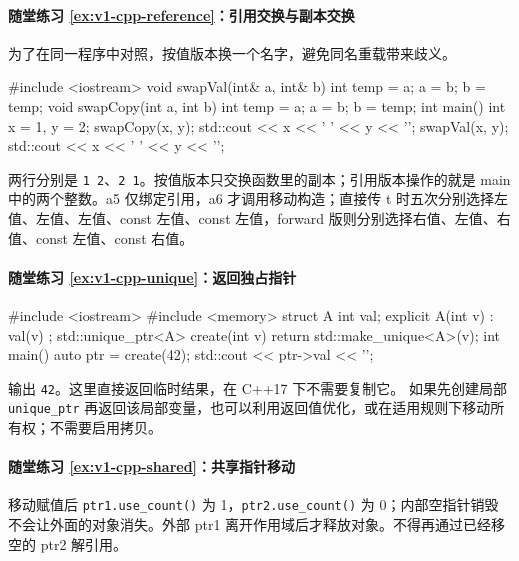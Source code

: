 \paragraph*{随堂练习 \ref{ex:v1-cpp-reference}：引用交换与副本交换}
\begin{solution}
为了在同一程序中对照，按值版本换一个名字，避免同名重载带来歧义。
\begin{tcpp}
#include <iostream>
void swapVal(int& a, int& b) {
    int temp = a; a = b; b = temp;
}
void swapCopy(int a, int b) {
    int temp = a; a = b; b = temp;
}
int main() {
    int x = 1, y = 2;
    swapCopy(x, y);
    std::cout << x << ' ' << y << '\n';
    swapVal(x, y);
    std::cout << x << ' ' << y << '\n';
}
\end{tcpp}
两行分别是 \texttt{1 2}、\texttt{2 1}。按值版本只交换函数里的副本；引用版本操作的就是 main 中的两个整数。a5 仅绑定引用，a6 才调用移动构造；直接传 t 时五次分别选择左值、左值、左值、const 左值、const 左值，forward 版则分别选择右值、左值、右值、const 左值、const 右值。
\end{solution}

\paragraph*{随堂练习 \ref{ex:v1-cpp-unique}：返回独占指针}
\begin{solution}
\begin{tcpp}
#include <iostream>
#include <memory>
struct A {
    int val;
    explicit A(int v) : val(v) {}
};
std::unique_ptr<A> create(int v) {
    return std::make_unique<A>(v);
}
int main() {
    auto ptr = create(42);
    std::cout << ptr->val << '\n';
}
\end{tcpp}
输出 \texttt{42}。这里直接返回临时结果，在 C++17 下不需要复制它。
如果先创建局部 \texttt{unique\_ptr} 再返回该局部变量，也可以利用返回值优化，或在适用规则下移动所有权；不需要启用拷贝。
\end{solution}

\paragraph*{随堂练习 \ref{ex:v1-cpp-shared}：共享指针移动}
\begin{solution}
移动赋值后 \texttt{ptr1.use\_count()} 为 1，\texttt{ptr2.use\_count()} 为 0；内部空指针销毁不会让外面的对象消失。外部 ptr1 离开作用域后才释放对象。不得再通过已经移空的 ptr2 解引用。
\end{solution}
